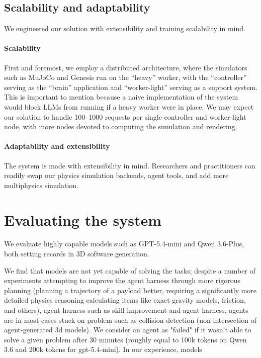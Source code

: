 \documentclass[conference]{IEEEtran}
\begin{document}
\subsection{Scalability and adaptability}
We engineered our solution with extensibility and training scalability in mind.

\paragraph{Scalability}
First and foremost, we employ a distributed architecture, where the simulators such as MuJoCo and Genesis run on the ``heavy'' worker, with the ``controller'' serving as the ``brain'' application and ``worker-light'' serving as a support system. This is important to mention because a naive implementation of the system would block LLMs from running if a heavy worker were in place. We may expect our solution to handle 100--1000 requests per single controller and worker-light node, with more nodes devoted to computing the simulation and rendering.

\paragraph{Adaptability and extensibility}
The system is made with extensibility in mind. Researchers and practitioners can readily swap our physics simulation backends, agent tools, and add more multiphysics simulation.

\section{Evaluating the system}

We evaluate highly capable models such as GPT-5.4-mini and Qwen 3.6-Plus, both setting records in 3D software generation.

We find that models are not yet capable of solving the tasks; despite a number of experiments attempting to improve the agent harness through more rigorous planning (planning a trajectory of a payload better, requiring a significantly more detailed physics reasoning calculating items like exact gravity models, friction, and others), agent harness such as skill improvement and agent harness, agents are in most cases stuck on problem such as collision detection (non-intersection of agent-generated 3d models).
We consider an agent as "failed" if it wasn't able to solve a given problem after 30 minutes (roughly equal to 100k tokens on Qwen 3.6 and 200k tokens for gpt-5.4-mini). In our experience, models
\end{document}
